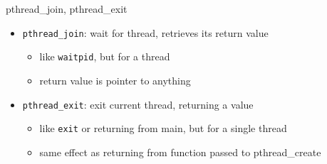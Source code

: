 
\begin{frame}{pthread\_join, pthread\_exit}
\begin{itemize}
\item \texttt{pthread\_join}: wait for thread, retrieves its return value
    \begin{itemize}
    \item like \texttt{waitpid}, but for a thread
    \item return value is pointer to anything
    \end{itemize}
\item \texttt{pthread\_exit}: exit current thread, returning a value
    \begin{itemize}
    \item like \texttt{exit} or returning from main, but for a single thread
    \item same effect as returning from function passed to pthread\_create
    \end{itemize}
\end{itemize}
\end{frame}
